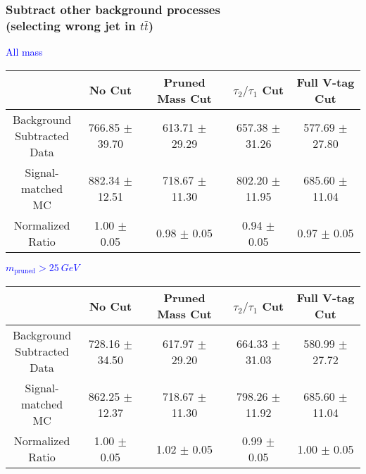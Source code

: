 \documentclass{beamer}
\begin{document}
\begin{frame}
  \frametitle{Subtract other background processes \\ (selecting wrong jet in $t\bar{t}$)}
  \begin{adjustwidth}{-1.5em}{-1.5em}
    \centering
    \vspace{6pt}
    \textcolor{blue}{All mass}
    \vspace{6pt}

    {\scriptsize
      \begin{tabular}{c | c | c | c | c}
        \hline
        & No Cut & Pruned Mass Cut & $\tau_2/\tau_1$ Cut & Full V-tag Cut \\
        \hline
        \makecell{Background \\ Subtracted \\ Data} & 766.85 $\pm$ 39.70 & 613.71 $\pm$ 29.29 & 657.38 $\pm$ 31.26 & 577.69 $\pm$ 27.80 \\
        \makecell{Signal-\\ matched MC} & 882.34 $\pm$ 12.51 & 718.67 $\pm$ 11.30 & 802.20 $\pm$ 11.95 & 685.60 $\pm$ 11.04 \\
        \hline
        \makecell{Normalized \\ Ratio} & 1.00 $\pm$ 0.05 & 0.98 $\pm$ 0.05 & 0.94 $\pm$ 0.05 & 0.97 $\pm$ 0.05 \\
        \hline
      \end{tabular}
    }

    \vspace{6pt}
    \textcolor{blue}{$m_\text{pruned} > \SI{25}{GeV}$}
    \vspace{6pt}

    {\scriptsize
      \begin{tabular}{c | c | c | c | c}
        \hline
        & No Cut & Pruned Mass Cut & $\tau_2/\tau_1$ Cut & Full V-tag Cut \\
        \hline
        \makecell{Background \\ Subtracted \\ Data} & 728.16 $\pm$ 34.50 & 617.97 $\pm$ 29.20 & 664.33 $\pm$ 31.03 & 580.99 $\pm$ 27.72 \\
        \makecell{Signal-\\ matched MC} & 862.25 $\pm$ 12.37 & 718.67 $\pm$ 11.30 & 798.26 $\pm$ 11.92 & 685.60 $\pm$ 11.04 \\
        \hline
        \makecell{Normalized \\ Ratio} & 1.00 $\pm$ 0.05 & 1.02 $\pm$ 0.05 & 0.99 $\pm$ 0.05 & 1.00 $\pm$ 0.05 \\
        \hline
      \end{tabular}
    }
  \end{adjustwidth}
\end{frame}
\end{document}
